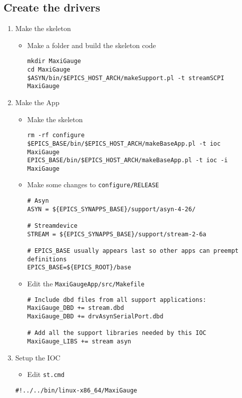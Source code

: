 \documentclass[11pt]{article}
\begin{document}
\subsection{Create the drivers}
\label{sec-2-1}
\begin{enumerate}
\item Make the skeleton
\label{sec-2-1-1}
\begin{itemize}
\item Make a folder and build the skeleton code
\begin{verbatim}
mkdir MaxiGauge
cd MaxiGauge
$ASYN/bin/$EPICS_HOST_ARCH/makeSupport.pl -t streamSCPI MaxiGauge
\end{verbatim}
\end{itemize}

\item Make the App
\label{sec-2-1-2}
\begin{itemize}
\item Make the skeleton
\begin{verbatim}
rm -rf configure
$EPICS_BASE/bin/$EPICS_HOST_ARCH/makeBaseApp.pl -t ioc MaxiGauge
EPICS_BASE/bin/$EPICS_HOST_ARCH/makeBaseApp.pl -t ioc -i MaxiGauge
\end{verbatim}
\item Make some changes to \verb~configure/RELEASE~
\begin{verbatim}
# Asyn
ASYN = ${EPICS_SYNAPPS_BASE}/support/asyn-4-26/

# Streamdevice
STREAM = ${EPICS_SYNAPPS_BASE}/support/stream-2-6a

# EPICS_BASE usually appears last so other apps can preempt definitions
EPICS_BASE=${EPICS_ROOT}/base
\end{verbatim}
\item Edit the \verb~MaxiGaugeApp/src/Makefile~
\begin{verbatim}
# Include dbd files from all support applications:
MaxiGauge_DBD += stream.dbd
MaxiGauge_DBD += drvAsynSerialPort.dbd

# Add all the support libraries needed by this IOC
MaxiGauge_LIBS += stream asyn
\end{verbatim}
\end{itemize}

\item Setup the IOC
\label{sec-2-1-3}
\begin{itemize}
\item Edit \verb~st.cmd~
\end{itemize}
\begin{verbatim}
#!../../bin/linux-x86_64/MaxiGauge


\end{verbatim}
\end{enumerate}
\end{document}

